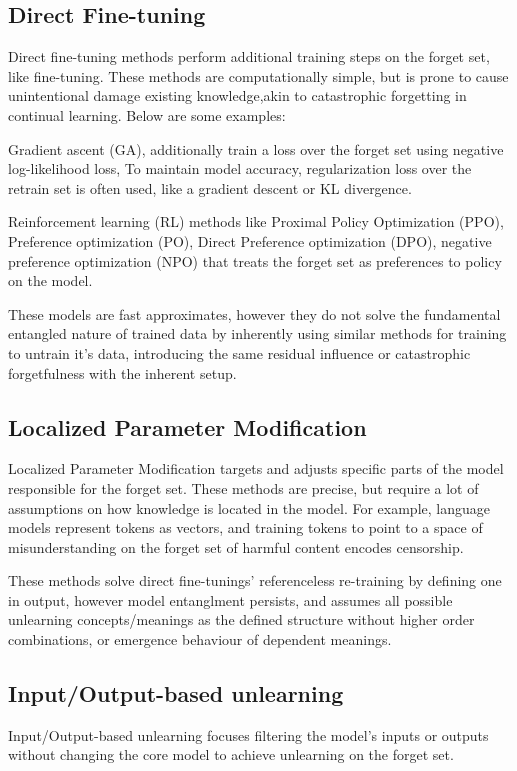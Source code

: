 \documentclass{surreydissertation}
\begin{document}
\subsection{Direct Fine-tuning}
Direct fine-tuning methods perform additional training steps on the forget set, like fine-tuning. These methods are computationally simple, but is prone to cause unintentional damage existing knowledge,akin to catastrophic forgetting in continual learning. Below are some examples:

Gradient ascent (GA), additionally train a loss over the forget set using negative log-likelihood loss, To maintain model accuracy, regularization loss over the retrain set is often used, like a gradient descent or KL divergence. 

Reinforcement learning (RL) methods like Proximal Policy Optimization (PPO), Preference optimization (PO), Direct Preference optimization (DPO), negative preference optimization (NPO) that treats the forget set as preferences to policy on the model.

These models are fast approximates, however they do not solve the fundamental entangled nature of trained data by inherently using similar methods for training to untrain it's data, introducing the same residual influence or catastrophic forgetfulness with the inherent setup.

\subsection{Localized Parameter Modification}
Localized Parameter Modification targets and adjusts specific parts of the model responsible for the forget set. These methods are precise, but require a lot of assumptions on how knowledge is located in the model. For example, language models represent tokens as vectors, and training tokens to point to a space of misunderstanding on the forget set of harmful content encodes censorship.

These methods solve direct fine-tunings' referenceless re-training by defining one in output, however model entanglment persists, and assumes all possible unlearning concepts/meanings as the defined structure without higher order combinations, or emergence behaviour of dependent meanings.

\subsection{Input/Output-based unlearning}
Input/Output-based unlearning focuses filtering the model's inputs or outputs without changing the core model to achieve unlearning on the forget set. 
\end{document}
